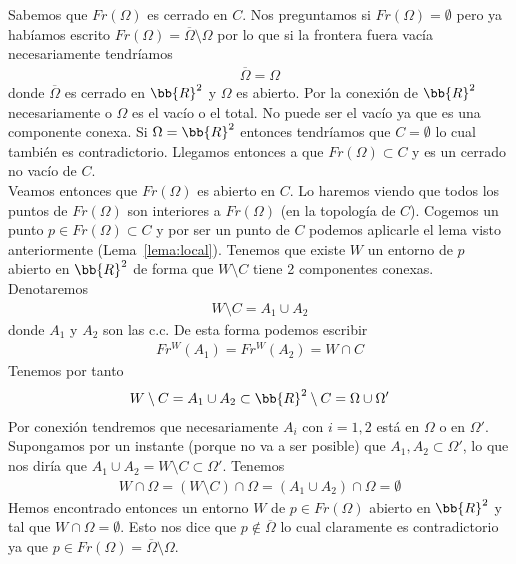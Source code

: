 \begin{observacion}
    Sabemos que $Fr(\Omega)$ es cerrado en $C$. Nos preguntamos si $Fr(\Omega)=\emptyset$ pero ya habíamos escrito $Fr(\Omega) = \overline{\Omega} \setminus \Omega$ por lo que si la frontera fuera vacía necesariamente tendríamos
    \begin{gather*}
        \overline{\Omega} = \Omega
    \end{gather*}
    donde $\overline{\Omega}$ es cerrado en $\bb{R}^2$ y $\Omega$ es abierto. Por la conexión de $\bb{R}^2$ necesariamente o $\Omega$ es el vacío o el total. No puede ser el vacío ya que es una componente conexa. Si $\Omega=\bb{R}^2$ entonces tendríamos que $C=\emptyset$ lo cual también es contradictorio. Llegamos entonces a que $Fr(\Omega)\subset C$ y es un cerrado no vacío de $C$.\\

    Veamos entonces que $Fr(\Omega)$ es abierto en $C$. Lo haremos viendo que todos los puntos de $Fr(\Omega)$ son interiores a $Fr(\Omega)$ (en la topología de $C$). Cogemos un punto $p\in Fr(\Omega)\subset C$ y por ser un punto de $C$ podemos aplicarle el lema visto anteriormente (Lema~\ref{lema:local}). Tenemos que existe $W$ un entorno de $p$ abierto en $\bb{R}^2$ de forma que $W\setminus C$ tiene 2 componentes conexas. Denotaremos 
    \begin{gather*}
        W \setminus C = A_1 \cup A_2
    \end{gather*}
    donde $A_1$ y $A_2$ son las c.c. De esta forma podemos escribir
    \begin{gather*}
        Fr^W(A_1) = Fr^W(A_2) = W \cap C
    \end{gather*}
    Tenemos por tanto
    \begin{gather*}
        W \setminus C = A_1 \cup A_2 \subset \bb{R}^2 \setminus C = \Omega \cup \Omega'
    \end{gather*}
    Por conexión tendremos que necesariamente $A_i$ con $i=1,2$ está en $\Omega$ o en $\Omega'$. Supongamos por un instante (porque no va a ser posible) que $A_1, A_2\subset \Omega'$, lo que nos diría que $A_1\cup A_2 = W \setminus C \subset  \Omega'$. Tenemos
    \begin{gather*}
        W \cap \Omega = (W \setminus C) \cap \Omega = (A_1\cup A_2) \cap \Omega = \emptyset
    \end{gather*}
    Hemos encontrado entonces un entorno $W$ de $p\in Fr(\Omega)$ abierto en $\bb{R}^2$ y tal que $W\cap \Omega = \emptyset$. Esto nos dice que $p\not\in \overline{\Omega}$ lo cual claramente es contradictorio ya que $p\in Fr(\Omega) = \overline{\Omega} \setminus \Omega$.\\


\end{observacion}
